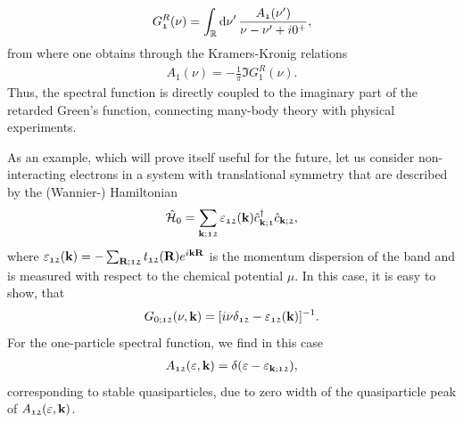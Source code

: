 \documentclass[\main/main.tex]{subfiles}
\begin{document}
\begin{align}
	G_{\mathfrak{1}}^{R}(\nu)=\int_{\mathbb{R}}^{}\text{d}\nu'\,\frac{A_{\mathfrak{1}}(\nu')}{\nu-\nu'+i 0^{+}},
\end{align}
from where one obtains through the Kramers-Kronig relations
\begin{align}
	A_{\mathfrak{1}}(\nu) = -\frac1\pi \Im G_{\mathfrak{1}}^{R}(\nu).
\end{align}
Thus, the spectral function is directly coupled to the imaginary part of the retarded Green's function, connecting many-body theory with physical experiments.

As an example, which will prove itself useful for the future, let us consider non-interacting electrons in a system with translational symmetry that are described by the (Wannier-) Hamiltonian
\begin{align}
	\hat{\mathcal{H}}_0=\sum_{\textbf{k};\mathfrak{12}}\varepsilon_{\mathfrak{12}}(\textbf{k})\hat c^{\dagger}_{\textbf{k};\mathfrak{1}}\hat c_{\textbf{k};\mathfrak{2}},
\end{align}
where $\varepsilon_{\mathfrak{12}}(\textbf{k})=-\sum_{\textbf{R};\mathfrak{12}} t_{\mathfrak{12}}(\textbf{R})e^{i\textbf{kR}}$ is the momentum dispersion of the band and is measured with respect to the chemical potential $\mu$. In this case, it is easy to show, that 
\begin{align}\label{eq:non_interacting_one_p_green}
	G_{0;\mathfrak{12}}(\nu, \textbf{k})=[i\nu\delta_{\mathfrak{12}}-\varepsilon_{\mathfrak{12}}(\textbf{k})]^{-1}.
\end{align}
For the one-particle spectral function, we find in this case 
\begin{align}
	A_{\mathfrak{12}}(\varepsilon,\textbf{k})=\delta(\varepsilon-\varepsilon_{\textbf{k};\mathfrak{12}}),
\end{align}
corresponding to stable quasiparticles, due to zero width of the quasiparticle peak of $A_{\mathfrak{12}}(\varepsilon,\textbf{k})$.
\end{document}
